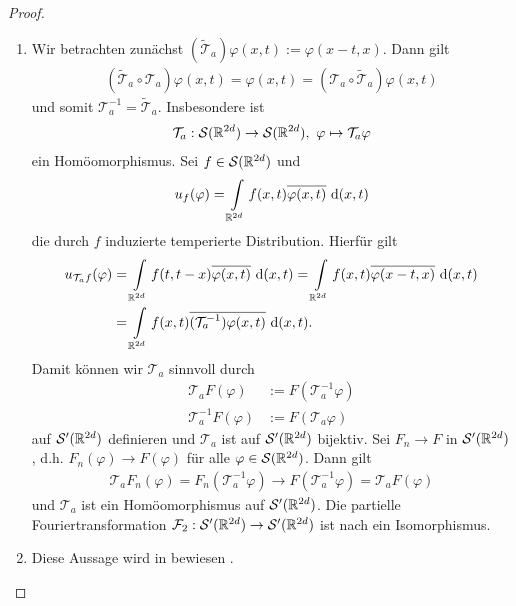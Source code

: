 \begin{proof}
	\begin{enumerate}[label =\textbf{(\roman*)}]
		\item 
		Wir betrachten zunächst $ (\tilde{\mathcal{T}}_a) \varphi(x,t)
		:= \varphi(x-t,x)  $.
		Dann gilt
		\begin{align*}
		(\tilde{\mathcal{T}}_a \circ \mathcal{T}_a) \varphi(x,t) = 
		\varphi (x,t)
		=
		(\mathcal{T}_a \circ \tilde{\mathcal{T}}_a) \varphi(x,t)
		\end{align*}
		und somit $ \mathcal{T}_a^{-1}  = \tilde{\mathcal{T}}_a$. Insbesondere ist 
		\begin{align*}
		\mathcal{T}_a : \mathcal{S}(\mathbb{R}^{2d}) \to \mathcal{S}(\mathbb{R}^{2d}), \
		\varphi \mapsto \mathcal{T}_a \varphi
		\end{align*}
		ein Homöomorphismus. 
		Sei $ f \in \mathcal{S}(\mathbb{R}^{2d}) $ und 
		\begin{align*}
		u_f(\varphi) 
		= \int \limits_{\mathbb{R}^{2d}} f(x,t) \overline{\varphi(x,t)} \text{ d} (x,t)
		\end{align*}
		die durch $ f  $ induzierte temperierte Distribution.
		Hierfür gilt
		\begin{align*}
		u_{\mathcal{T}_a f}(\varphi) 
		&=
		\int \limits_{\mathbb{R}^{2d}}
		f(t,t-x) \overline{\varphi(x,t)} \text{ d} (x,t)
		=
		\int \limits_{\mathbb{R}^{2d}}
		f(x,t) \overline{\varphi(x-t,x)} \text{ d} (x,t)\\
		&=
		\int \limits_{\mathbb{R}^{2d}}
		f(x,t) \overline{(\mathcal{T}_a^{-1})\varphi(x,t)} \text{ d} (x,t).
		\end{align*}
		Damit können wir $ \mathcal{T}_a $ sinnvoll durch
		\begin{align*}
		\mathcal{T}_a F( \varphi)
		&:=
		F(\mathcal{T}_a^{-1} \varphi)\\
		\mathcal{T}_a^{-1} F( \varphi)
		&:=
		F(\mathcal{T}_a \varphi)
		\end{align*}
		auf $ \mathcal{S}^\prime(\mathbb{R}^{2d}) $ definieren und $ \mathcal{T}_a $ ist auf $ \mathcal{S}^\prime(\mathbb{R}^{2d}) $ bijektiv. 
		Sei $ F_n \to F $ in $ \mathcal{S}^\prime(\mathbb{R}^{2d}) $, d.h. $ F_n(\varphi) \to F(\varphi) $
		für alle $ \varphi \in \mathcal{S}(\mathbb{R}^{2d}) $.
		Dann gilt
		\begin{align*}
		\mathcal{T}_a F_n(\varphi )
		=
		F_n(\mathcal{T}_a^{-1} \varphi) 
		\to 
		F(\mathcal{T}_a^{-1}\varphi) = \mathcal{T}_a F(\varphi)
		\end{align*}
		und $ \mathcal{T}_a $ ist ein Homöomorphismus auf $ \mathcal{S}^\prime(\mathbb{R}^{2d}) $.
		Die partielle Fouriertransformation $ \mathcal{F}_2 : \mathcal{S}^\prime(\mathbb{R}^{2d}) \to \mathcal{S}^\prime(\mathbb{R}^{2d}) $
		ist nach \cite[Seite~129]{mit} ein Isomorphismus.
		
		\item
		Diese Aussage wird in \cite[Theorem~4.13]{mit} bewiesen .
	\end{enumerate}
\end{proof}

